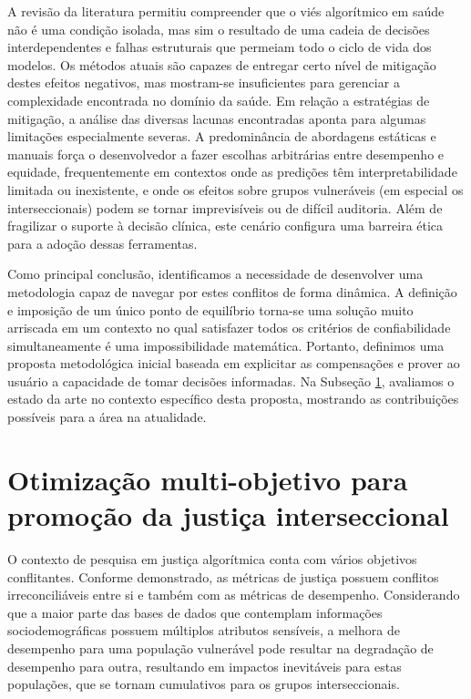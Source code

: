 A revisão da literatura permitiu compreender que o viés algorítmico em saúde não é uma condição isolada, mas sim o resultado de uma cadeia de decisões interdependentes e falhas estruturais que permeiam todo o ciclo de vida dos modelos. Os métodos atuais são capazes de entregar certo nível de mitigação destes efeitos negativos, mas mostram-se insuficientes para gerenciar a complexidade encontrada no domínio da saúde. Em relação a estratégias de mitigação, a análise das diversas lacunas encontradas aponta para algumas limitações especialmente severas. A predominância de abordagens estáticas e manuais força o desenvolvedor a fazer escolhas arbitrárias entre desempenho e equidade, frequentemente em contextos onde as predições têm interpretabilidade limitada ou inexistente, e onde os efeitos sobre grupos vulneráveis (em especial os interseccionais) podem se tornar imprevisíveis ou de difícil auditoria. Além de fragilizar o suporte à decisão clínica, este cenário configura uma barreira ética para a adoção dessas ferramentas.

Como principal conclusão, identificamos a necessidade de desenvolver uma metodologia capaz de navegar por estes conflitos de forma dinâmica. A definição e imposição de um único ponto de equilíbrio torna-se uma solução muito arriscada em um contexto no qual satisfazer todos os critérios de confiabilidade simultaneamente é uma impossibilidade matemática. Portanto, definimos uma proposta metodológica inicial baseada em explicitar as compensações e prover ao usuário a capacidade de tomar decisões informadas. Na Subseção \ref{sec:otimizacao_interseccional}, avaliamos o estado da arte no contexto específico desta proposta, mostrando as contribuições possíveis para a área na atualidade.

\section{Otimização multi-objetivo para promoção da justiça interseccional} \label{sec:otimizacao_interseccional}

O contexto de pesquisa em justiça algorítmica conta com vários objetivos conflitantes. Conforme demonstrado, as métricas de justiça possuem conflitos irreconciliáveis entre si e também com as métricas de desempenho. Considerando que a maior parte das bases de dados que contemplam informações sociodemográficas possuem múltiplos atributos sensíveis, a melhora de desempenho para uma população vulnerável pode resultar na degradação de desempenho para outra, resultando em impactos inevitáveis para estas populações, que se tornam cumulativos para os grupos interseccionais.


